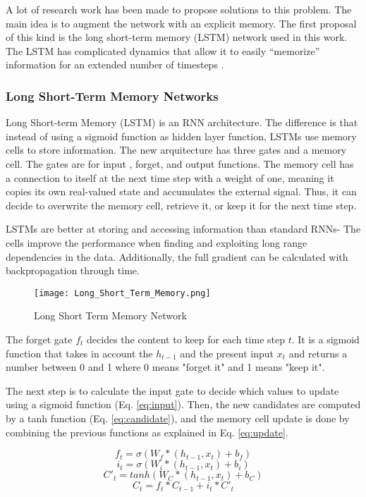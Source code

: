 A lot of research work has been made to propose solutions to this problem. The main idea is to augment the network with an explicit memory. The first proposal of this kind is the long short-term memory (LSTM) network used in this work. The LSTM has complicated dynamics that allow it to easily “memorize” information for an extended number of timesteps \cite{zaremba2014recurrent}.


\subsubsection{Long Short-Term Memory Networks}
Long Short-term Memory (LSTM) is an RNN architecture. The difference is that instead of using a sigmoid function as hidden layer function, LSTMs use memory cells to store information. The new arquitecture has three gates and a memory cell. The gates are for input , forget, and output functions. The memory cell has a connection to itself at the next time step with a weight of one, meaning it copies its own real-valued state and accumulates the external signal\cite{lecun2015deep}. Thus, it can decide to overwrite the memory cell, retrieve it, or keep it for the next time step\cite{zaremba2014recurrent}. 

LSTMs are better at storing and accessing information than standard RNNs- The cells improve the performance when finding and exploiting long range dependencies in the data. Additionally, the full gradient can be calculated with backpropagation through time.\cite{graves2013generating}

\begin{figure}
\label{fig:lstm}
\center
\texttt{[image: Long\_Short\_Term\_Memory.png]}
\caption{Long Short Term Memory Network}
\end{figure}

The forget gate $f_t$ decides the content to keep for each time step $t$. It is a sigmoid function that takes in account the $h_{t-1}$ and the present input $x_t$ and returns a number between 0 and 1 where 0 means "forget it" and 1 means "keep it". 

The next step is to calculate the input gate to decide which values to update using a sigmoid function (Eq. \ref{eq:input}). Then, the new candidates are computed by a tanh function (Eq. \ref{eq:candidate}), and the memory cell update is done by combining the previous functions as explained in Eq. \ref{eq:update}.

\begin{equation} \label{eq:forget}
f_t=\sigma(W_f*(h_{t-1},x_t)+b_f)
\end{equation}
\begin{equation} \label{eq:input}
i_t=\sigma(W_i*(h_{t-1},x_t)+b_i)
\end{equation}
\begin{equation} \label{eq:candidate}
C'_t=tanh(W_C*(h_{t-1},x_t)+b_C)
\end{equation}
\begin{equation} \label{eq:update}
C_t=f_t*C_{t-1}+i_t*C'_t
\end{equation}

